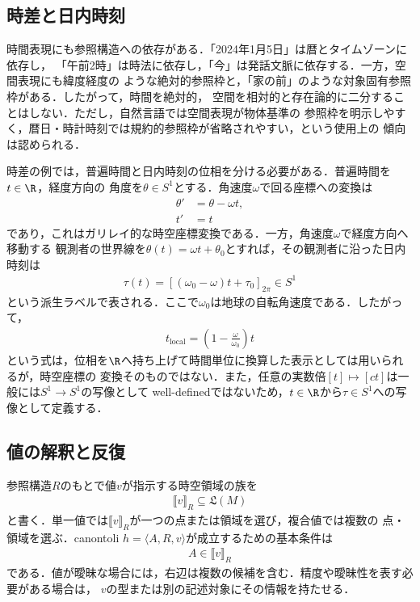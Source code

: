 \documentclass[../../main-detail.tex]{subfiles}
\begin{document}
\subsection{時差と日内時刻}

時間表現にも参照構造への依存がある．「2024年1月5日」は暦とタイムゾーンに依存し，
「午前2時」は時法に依存し，「今」は発話文脈に依存する．一方，空間表現にも緯度経度の
ような絶対的参照枠と，「家の前」のような対象固有参照枠がある．したがって，時間を絶対的，
空間を相対的と存在論的に二分することはしない．ただし，自然言語では空間表現が物体基準の
参照枠を明示しやすく，暦日・時計時刻では規約的参照枠が省略されやすい，という使用上の
傾向は認められる．

時差の例では，普遍時間と日内時刻の位相を分ける必要がある．普遍時間を$t\in\R$，経度方向の
角度を$\theta\in S^1$とする．角速度$\omega$で回る座標への変換は
\begin{align*}
    \theta'&=\theta-\omega t,\\
    t'&=t
\end{align*}
であり，これはガリレイ的な時空座標変換である．一方，角速度$\omega$で経度方向へ移動する
観測者の世界線を$\theta(t)=\omega t+\theta_0$とすれば，その観測者に沿った日内時刻は
\begin{align*}
    \tau(t)
    =
    \left[(\omega_0-\omega)t+\tau_0\right]_{2\pi}
    \in S^1
\end{align*}
という派生ラベルで表される．ここで$\omega_0$は地球の自転角速度である．したがって，
\begin{align*}
    t_{\mathrm{local}}
    =
    \left(1-\frac{\omega}{\omega_0}\right)t
\end{align*}
という式は，位相を$\R$へ持ち上げて時間単位に換算した表示としては用いられるが，時空座標の
変換そのものではない．また，任意の実数倍$[t]\mapsto[ct]$は一般には$S^1\to S^1$の写像として
well-definedではないため，$t\in\R$から$\tau\in S^1$への写像として定義する．

\subsection{値の解釈と反復}

参照構造$R$のもとで値$v$が指示する時空領域の族を
\begin{align*}
    \llbracket v\rrbracket_R
    \subseteq
    \mathfrak{L}(M)
\end{align*}
と書く．単一値では$\llbracket v\rrbracket_R$が一つの点または領域を選び，複合値では複数の
点・領域を選ぶ．canontoli $h=\langle A,R,v\rangle$が成立するための基本条件は
\begin{align*}
    A\in\llbracket v\rrbracket_R
\end{align*}
である．値が曖昧な場合には，右辺は複数の候補を含む．精度や曖昧性を表す必要がある場合は，
$v$の型または別の記述対象にその情報を持たせる．
\end{document}
